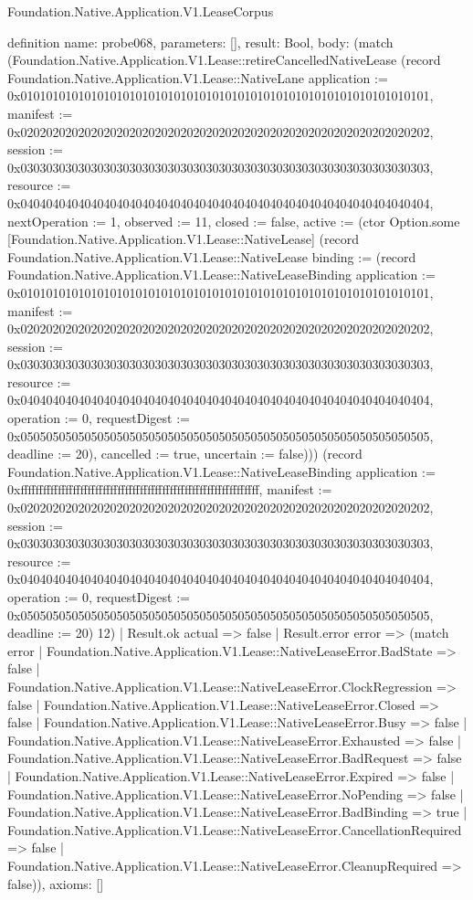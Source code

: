 \begin{lexlean}{Foundation.Native.Application.V1.LeaseCorpus}
\begin{semanticmodule}
definition{
  name: probe068,
  parameters: [],
  result: Bool,
  body: (match (Foundation.Native.Application.V1.Lease::retireCancelledNativeLease (record Foundation.Native.Application.V1.Lease::NativeLane {application := 0x0101010101010101010101010101010101010101010101010101010101010101, manifest := 0x0202020202020202020202020202020202020202020202020202020202020202, session := 0x0303030303030303030303030303030303030303030303030303030303030303, resource := 0x0404040404040404040404040404040404040404040404040404040404040404, nextOperation := 1, observed := 11, closed := false, active := (ctor Option.some [Foundation.Native.Application.V1.Lease::NativeLease] (record Foundation.Native.Application.V1.Lease::NativeLease {binding := (record Foundation.Native.Application.V1.Lease::NativeLeaseBinding {application := 0x0101010101010101010101010101010101010101010101010101010101010101, manifest := 0x0202020202020202020202020202020202020202020202020202020202020202, session := 0x0303030303030303030303030303030303030303030303030303030303030303, resource := 0x0404040404040404040404040404040404040404040404040404040404040404, operation := 0, requestDigest := 0x0505050505050505050505050505050505050505050505050505050505050505, deadline := 20}), cancelled := true, uncertain := false}))}) (record Foundation.Native.Application.V1.Lease::NativeLeaseBinding {application := 0xffffffffffffffffffffffffffffffffffffffffffffffffffffffffffffffff, manifest := 0x0202020202020202020202020202020202020202020202020202020202020202, session := 0x0303030303030303030303030303030303030303030303030303030303030303, resource := 0x0404040404040404040404040404040404040404040404040404040404040404, operation := 0, requestDigest := 0x0505050505050505050505050505050505050505050505050505050505050505, deadline := 20}) 12)
    | Result.ok actual => false
    | Result.error error => (match error
      | Foundation.Native.Application.V1.Lease::NativeLeaseError.BadState => false
      | Foundation.Native.Application.V1.Lease::NativeLeaseError.ClockRegression => false
      | Foundation.Native.Application.V1.Lease::NativeLeaseError.Closed => false
      | Foundation.Native.Application.V1.Lease::NativeLeaseError.Busy => false
      | Foundation.Native.Application.V1.Lease::NativeLeaseError.Exhausted => false
      | Foundation.Native.Application.V1.Lease::NativeLeaseError.BadRequest => false
      | Foundation.Native.Application.V1.Lease::NativeLeaseError.Expired => false
      | Foundation.Native.Application.V1.Lease::NativeLeaseError.NoPending => false
      | Foundation.Native.Application.V1.Lease::NativeLeaseError.BadBinding => true
      | Foundation.Native.Application.V1.Lease::NativeLeaseError.CancellationRequired => false
      | Foundation.Native.Application.V1.Lease::NativeLeaseError.CleanupRequired => false)),
  axioms: []
}


\end{semanticmodule}
\end{lexlean}
